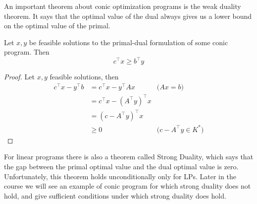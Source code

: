 \documentclass[answers]{exam}
\begin{document}
	An important theorem about conic optimization programs is the weak duality theorem. It says that the optimal value of the dual always gives us a lower bound on the optimal value of the primal.
	\begin{theorem}
		Let $x,y$ be feasible solutions to the primal-dual formulation of some conic program. Then 
		$$ c^\top x \geq b^\top y $$
	\end{theorem}
	\begin{proof}
		Let $x,y$ feasible solutions, then 
		\begin{align*}
			c^\top x -y^\top b &= c^\top x - y^\top Ax &\text{($Ax = b$)}\\ 
			&= c^\top x - (A^\top y)^\top x &\\ 
			&= (c - A^\top y)^\top x&\\ 
			&\geq 0 & \text{($c - A^\top y\in K^*$)}
		\end{align*}
	\end{proof}
	For linear programs there is also a theorem called Strong Duality, which says that the gap between the primal optimal value and the dual optimal value is zero. Unfortunately, this theorem holds unconditionally only for LPs. Later in the course we will see an example of conic program for which strong duality does not hold, and give sufficient conditions under which strong duality does hold.
\end{document}
